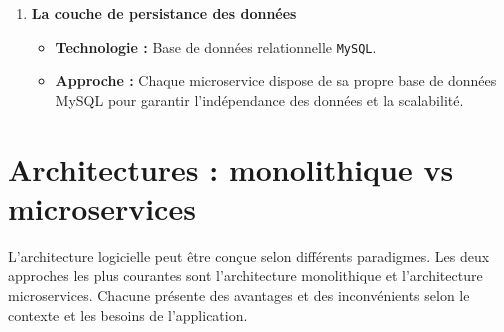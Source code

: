 \begin{enumerate}[label=\textbf{\alph*.}]
    \begin{itemize}[label=\textbullet]
        \item \textbf{\texttt{auth-service2}} : Authentifie les utilisateurs et génère les jetons JWT.
        \item \textbf{Services ISO 8583} : Traitement complet de la norme ISO :
        \begin{itemize}[label=$\triangleright$]
            \item \texttt{PackingISOService} : Encode les messages ISO.
            \item \texttt{DepackingISOService} : Décode les messages ISO.
            \item \texttt{ResponseISOService} : Valide les transactions et retourne la réponse.
        \end{itemize}
        \item \textbf{\texttt{TransactionHistoryService}} : Gère l'historique des opérations ISO pour audit et traçabilité.
        \item \textbf{\texttt{NotificationService}} : Envoie des messages aux utilisateurs (email, etc.).
        \item \textbf{\texttt{MonitoringService}} : Supervise la santé des microservices (logs, alertes, métriques).
    \end{itemize}

    \item \textbf{La couche de persistance des données}

    \begin{itemize}[label=\textbullet]
        \item \textbf{Technologie :} Base de données relationnelle \texttt{MySQL}.
        \item \textbf{Approche :} Chaque microservice dispose de sa propre base de données MySQL pour garantir l'indépendance des données et la scalabilité.
    \end{itemize}

\end{enumerate}

\section{Architectures : monolithique vs microservices}
L'architecture logicielle peut être conçue selon différents paradigmes. Les deux approches les plus courantes sont l'architecture monolithique et l'architecture microservices. Chacune présente des avantages et des inconvénients selon le contexte et les besoins de l'application.

